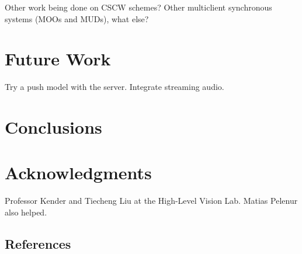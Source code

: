 \documentclass{sig-alternate}
\begin{document}
Other work being done on CSCW schemes?  Other multiclient synchronous 
systems (MOOs and MUDs), what else?

\section{Future Work} \label{con}

Try a push model with the server.  Integrate streaming audio.

\section{Conclusions}

\section{Acknowledgments}

Professor Kender and Tiecheng Liu at the High-Level Vision Lab.
Matias Pelenur also helped.


%


%

\subsection{References}


\balancecolumns %
\end{document}
